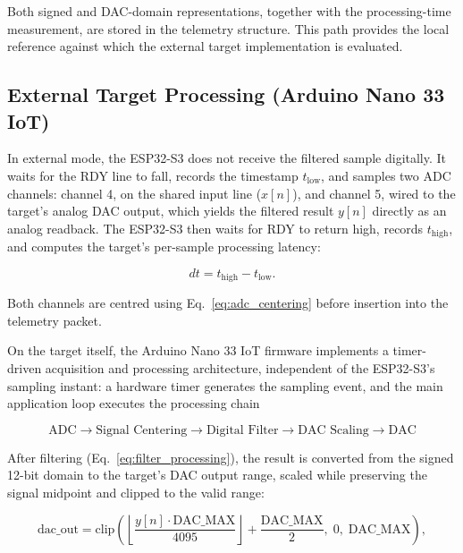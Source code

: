 Both signed and DAC-domain representations, together with the processing-time
measurement, are stored in the telemetry structure. This path provides the
local reference against which the external target implementation is evaluated.

\subsection{External Target Processing (Arduino Nano 33 IoT)}
\label{sec:external_target_processing}

In external mode, the ESP32-S3 does not receive the filtered sample digitally.
It waits for the RDY line to fall, records the timestamp $t_\text{low}$, and
samples two ADC channels: channel 4, on the shared input line ($x[n]$), and
channel 5, wired to the target's analog DAC output, which yields the filtered
result $y[n]$ directly as an analog readback. The ESP32-S3 then waits for RDY
to return high, records $t_\text{high}$, and computes the target's per-sample
processing latency:

\begin{equation}
    dt = t_\text{high} - t_\text{low}.
    \label{eq:external_dt}
\end{equation}

Both channels are centred using Eq.~\ref{eq:adc_centering} before insertion
into the telemetry packet.

On the target itself, the Arduino Nano 33 IoT firmware implements a
timer-driven acquisition and processing architecture, independent of the
ESP32-S3's sampling instant: a hardware timer generates the sampling event, and
the main application loop executes the processing chain

\begin{equation}
    \boxed{
        \text{ADC}
        \rightarrow
        \text{Signal Centering}
        \rightarrow
        \text{Digital Filter}
        \rightarrow
        \text{DAC Scaling}
        \rightarrow
        \text{DAC}
    }
    \label{eq:external_sequence}
\end{equation}

After filtering (Eq.~\ref{eq:filter_processing}), the result is converted from
the signed 12-bit domain to the target's DAC output range, scaled while
preserving the signal midpoint and clipped to the valid range:

\begin{equation}
    \text{dac\_out} = \mathrm{clip}\!\left(
    \left\lfloor \frac{y[n]\cdot \text{DAC\_MAX}}{4095}\right\rfloor
    + \frac{\text{DAC\_MAX}}{2},\; 0,\; \text{DAC\_MAX}\right),
    \label{eq:external_dac_scaling}
\end{equation}

